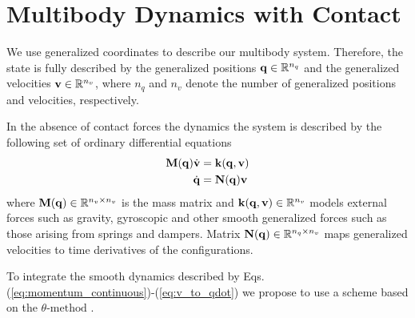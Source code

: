 \section{Multibody Dynamics with Contact}
\label{sec:multibody_dynamics_with_contact}

We use generalized coordinates to describe our multibody system. Therefore, the
state is fully described by the generalized positions
${\mathbf{q}}\in\mathbb{R}^{n_q}$ and the generalized velocities
${\mathbf{v}}\in\mathbb{R}^{n_v}$, where $n_q$ and $n_v$ denote the number of
generalized positions and velocities, respectively.

In the absence of contact forces the dynamics the system is described
by the following set of ordinary differential equations
\begin{align}
    \mf{M}(\mf{q})\dot{\mf{v}}&=\mf{k}(\mf{q},\mf{v})
    \label{eq:momentum_continuous}\\
    \dot{\mf{q}}&=\mf{N}(\mf{q})\mf{v}
    \label{eq:v_to_qdot}
\end{align}
where ${\mathbf{M}}({\mathbf{q}})\in\mathbb{R}^{n_v\times n_v}$ is the mass matrix and
${\mathbf{k}}({\mathbf{q}},{\mathbf{v}})\in\mathbb{R}^{n_v}$ models external forces such as
gravity, gyroscopic and other smooth generalized forces such as those arising
from springs and dampers. Matrix ${\mathbf{N}}({\mathbf{q}})\in\mathbb{R}^{n_q\times n_v}$
maps generalized velocities to time derivatives of the configurations.

To integrate the smooth dynamics described by Eqs.
(\ref{eq:momentum_continuous})-(\ref{eq:v_to_qdot}) we propose to use a scheme
based on the $\theta\text{-method}$ \cite[\S
II.7]{bib:hairer2008solving}.


